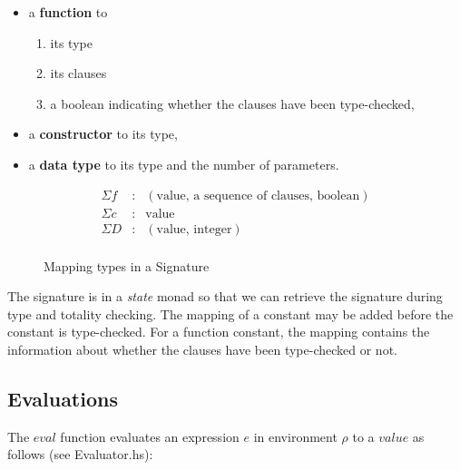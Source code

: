 \documentclass[acmsmall]{acmart}
\begin{document}
\begin{itemize}
  \item a \textbf{function} to
        \begin{enumerate}
          \item its type
          \item its clauses
          \item a boolean indicating whether the clauses have been type-checked,
        \end{enumerate}
  \item a \textbf{constructor} to its type,
  \item a \textbf{data type} to its type and the number of parameters.
\end{itemize}

\begin{figure}[H]
  \begin{equation*}
    \begin{aligned}
      \Sigma f & : & (\textrm{value, a sequence of clauses, boolean}) \\
      \Sigma c & : & \textrm{value}                                   \\
      \Sigma D & : & (\textrm{value, integer})                        \\
    \end{aligned}
  \end{equation*}
  \caption{Mapping types in a Signature}
\end{figure}

The signature is in a \textit{state} monad so that we can retrieve the signature during type and totality checking. The mapping of a constant may be added before the constant is type-checked. For a function constant, the mapping contains the information about whether the clauses have been type-checked or not.

\subsection{Evaluations}

The $eval$ function evaluates an expression $e$ in environment $\rho$ to a
$value$ as follows (see Evaluator.hs):
\end{document}
